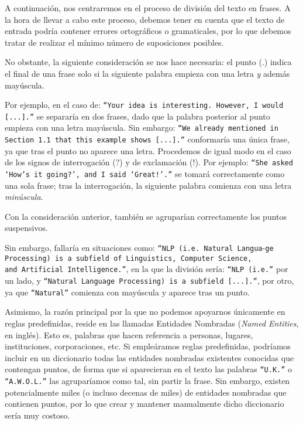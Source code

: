 A continuación, nos centraremos en el proceso de división del texto en frases. A la hora de llevar a cabo este proceso, debemos tener en cuenta que el texto de entrada podría contener errores ortográficos o gramaticales, por lo que debemos tratar de realizar el mínimo número de suposiciones posibles.

No obstante, la siguiente consideración se nos hace necesaria: el punto (.) indica el final de una frase solo si la siguiente palabra empieza con una letra \emph{y} además mayúscula.

Por ejemplo, en el caso de: \texttt{``Your idea is interesting. However, I would [...].''} se separaría en dos frases, dado que la palabra posterior al punto empieza con una letra mayúscula. Sin embargo: \texttt{``We already mentioned in Section 1.1 that this example shows [...].''} conformaría una única frase, ya que tras el punto no aparece una letra. Procedemos de igual modo en el caso de los signos de interrogación (?) y de exclamación (!). Por ejemplo: \texttt{``She asked \lq How's it going?\rq, and I said \lq Great!\rq.''} se tomará correctamente como una sola frase; tras la interrogación, la siguiente palabra comienza con una letra \emph{minúscula}.
	
Con la consideración anterior, también se agruparían correctamente los puntos suspensivos.

Sin embargo, fallaría en situaciones como: \texttt{``NLP (i.e. Natural Langua}-\texttt{ge Processing) is a subfield of Linguistics, Computer Science, \\ and Artificial Intelligence.''}, en la que la división sería: \texttt{``NLP (i.e.''} por un lado, y \texttt{``Natural Language Processing) is a subfield [...].''}, por otro, ya que \texttt{``Natural''} comienza con mayúscula y aparece tras un punto.

Asimismo, la razón principal por la que no podemos apoyarnos únicamente en reglas predefinidas, reside en las llamadas Entidades Nombradas (\emph{Named Entities}, en inglés). Esto es, palabras que hacen referencia a personas, lugares, instituciones, corporaciones, etc. Si empleáramos reglas predefinidas, podríamos incluir en un diccionario todas las entidades nombradas existentes conocidas que contengan puntos, de forma que si aparecieran en el texto las palabras \texttt{``U.K.''} o \texttt{``A.W.O.L.''} las agruparíamos como tal, sin partir la frase. Sin embargo, existen potencialmente miles (o incluso decenas de miles) de entidades nombradas que contienen puntos, por lo que crear y mantener manualmente dicho diccionario sería muy costoso.

